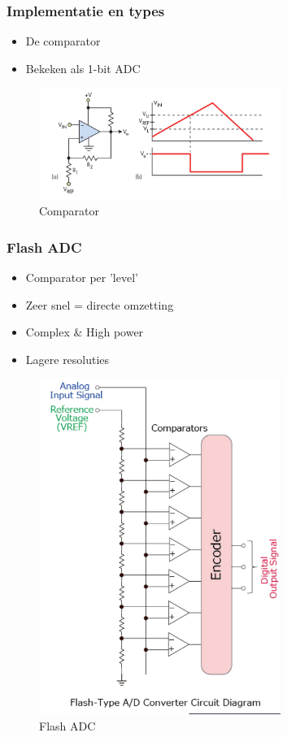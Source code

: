 \documentclass{article}
\begin{document}
\subsubsection{Implementatie en types}
\begin{itemize}
    \item De comparator
    \item Bekeken als 1-bit ADC
\end{itemize}

\begin{figure}[H]
    \centering
    \includegraphics[width=0.7\textwidth]{Screenshot_20200224_122504.png}
    \caption{Comparator}
\end{figure}

\subsubsection{Flash ADC}
\begin{itemize}
    \item Comparator per 'level'
    \item Zeer snel = directe omzetting
    \item Complex \& High power
    \item Lagere resoluties
\end{itemize}

\begin{figure}[H]
    \centering
    \includegraphics[width=0.7\textwidth]{Screenshot_20200224_122635.png}
    \caption{Flash ADC}
\end{figure}
\end{document}
